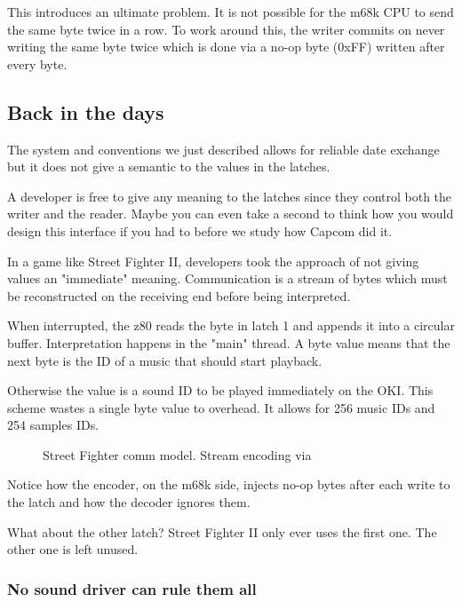 This introduces an ultimate problem. It is not possible for the m68k CPU to send the same byte twice in a row. To work around this, the writer commits on never writing the same byte twice which is done via a no-op byte (0xFF) written after every byte.




\subsection{Back in the days}
The system and conventions we just described allows for reliable date exchange but it does not give a semantic to the values in the latches. 

A developer is free to give any meaning to the latches since they control both the writer and the reader. Maybe you can even take a second to think how you would design this interface if you had to before we study how Capcom did it.

In a game like Street Fighter II, developers took the approach of not giving values an "immediate" meaning. Communication is a stream of bytes which must be reconstructed on the receiving end before being interpreted.



When interrupted, the z80 reads the byte in latch 1 and appends it into a circular buffer. Interpretation happens in the "main" thread. A byte value  means that the next byte is the ID of a music that should start playback. 

Otherwise the value is a sound ID to be played immediately on the OKI. This scheme wastes a single byte value to overhead. It allows for 256 music IDs and 254 samples IDs.

 \begin{figure}[H]
\caption*{Street Fighter comm model. Stream encoding via }
\end{figure}

Notice how the encoder, on the m68k side, injects  no-op bytes after each write to the latch and how the decoder ignores them.

What about the other latch? Street Fighter II only ever uses the first one. The other one is left unused.

\subsubsection{No sound driver can rule them all}

